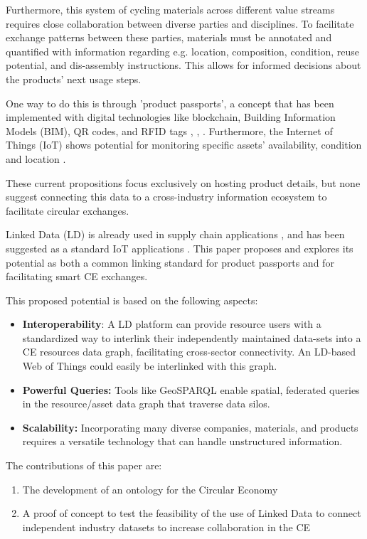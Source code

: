\documentclass[runningheads,a4paper]{llncs}
\begin{document}
Furthermore, this system of cycling materials across different value streams requires close collaboration between diverse parties and disciplines. To facilitate exchange patterns between these parties, materials must be annotated and quantified with information regarding e.g. location, composition, condition, reuse potential, and dis-assembly instructions. This allows for informed decisions about the products' next usage steps.

One way to do this is through 'product passports', a concept that has been implemented with digital technologies like blockchain, Building Information Models (BIM), QR codes, and RFID tags  \cite{_Ref490914539},  \cite{_Ref490914549},  \cite{_Ref490914559}. Furthermore, the Internet of Things (IoT) shows potential for monitoring specific assets' availability, condition and location  \cite{_Ref490914619}. 

These current propositions focus exclusively on hosting product details, but none suggest connecting this data to a cross-industry information ecosystem to facilitate circular exchanges.

Linked Data (LD) is already used in supply chain applications  \cite{_Ref490914641},  \cite{_Ref490914646} and has been suggested as a standard IoT applications  \cite{_Ref490914691}. This paper proposes and explores its potential as both a common linking standard for product passports and for facilitating smart CE exchanges.

This proposed potential is based on the following aspects:
\begin{itemize}
\item {\bf Interoperability}: A LD platform can provide resource users with a standardized way to interlink their independently maintained data-sets into a CE resources data graph, facilitating cross-sector connectivity. An LD-based Web of Things could easily be interlinked with this graph.
\item {\bf Powerful Queries:} Tools like GeoSPARQL enable spatial, federated queries in the resource/asset data graph that traverse data silos.
\item {\bf Scalability:} Incorporating many diverse companies, materials, and products requires a versatile technology that can handle unstructured information.
\end{itemize}

The contributions of this paper are:
\begin{enumerate}
\item The development of an ontology for the Circular Economy
\item A proof of concept to test the feasibility of the use of Linked Data to connect independent industry datasets to increase collaboration in the CE
\end{enumerate}
\end{document}
